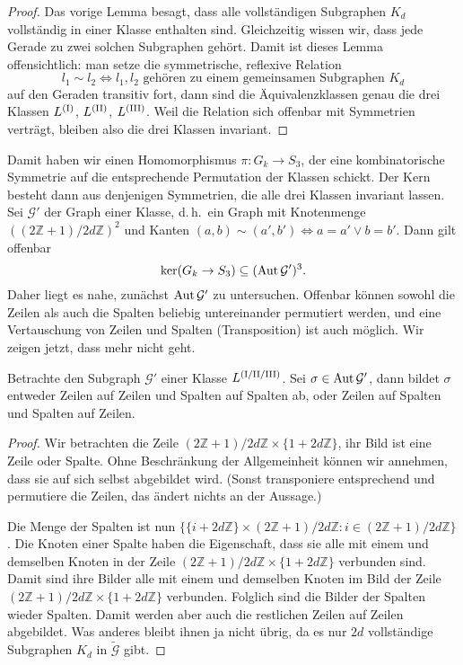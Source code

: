 \begin{proof}
Das vorige Lemma besagt, dass alle vollständigen Subgraphen $K_d$ vollständig in einer Klasse enthalten sind. Gleichzeitig wissen wir, dass jede Gerade zu zwei solchen Subgraphen gehört. Damit ist dieses Lemma offensichtlich: man setze die symmetrische, reflexive Relation
\begin{equation*}
l_1 \sim l_2 \Longleftrightarrow l_1, l_2 \text{ gehören zu einem gemeinsamen Subgraphen } K_d
\end{equation*}
auf den Geraden transitiv fort, dann sind die Äquivalenzklassen genau die drei Klassen $\Lcl(I)$, $\Lcl(II)$, $\Lcl(III)$. Weil die Relation sich offenbar mit Symmetrien verträgt, bleiben also die drei Klassen invariant.
\end{proof}

Damit haben wir einen Homomorphismus $\pi: G_k \to S_3$, der eine kombinatorische Symmetrie auf die entsprechende Permutation der Klassen schickt. Der Kern besteht dann aus denjenigen Symmetrien, die alle drei Klassen invariant lassen. Sei $\mathcal G'$ der Graph einer Klasse, d.\,h.~ein Graph mit Knotenmenge $((2\mathbb Z+1)/2d\mathbb Z)^2$ und Kanten $(a,b) \sim (a',b') \Longleftrightarrow a=a' \vee b=b'$. Dann gilt offenbar
\begin{equation}
\ker(G_k \rightarrow S_3) \subseteq (\operatorname{Aut} \mathcal G')^3.
\end{equation}
Daher liegt es nahe, zunächst $\operatorname{Aut} \mathcal G'$ zu untersuchen. Offenbar können sowohl die Zeilen als auch die Spalten beliebig untereinander permutiert werden, und eine Vertauschung von Zeilen und Spalten (Transposition) ist auch möglich. Wir zeigen jetzt, dass mehr nicht geht.
\begin{lemma}
Betrachte den Subgraph $\mathcal G'$ einer Klasse $\Lcl(I/II/III)$. Sei $\sigma \in \operatorname{Aut} \mathcal G'$, dann bildet $\sigma$ entweder Zeilen auf Zeilen und Spalten auf Spalten ab, oder Zeilen auf Spalten und Spalten auf Zeilen.
\end{lemma}
\begin{proof}
Wir betrachten die Zeile $(2\mathbb Z+1)/2d\mathbb Z \times \{1 + 2d\mathbb Z\}$, ihr Bild ist eine Zeile oder Spalte. Ohne Beschränkung der Allgemeinheit können wir annehmen, dass sie auf sich selbst abgebildet wird. (Sonst transponiere entsprechend und permutiere die Zeilen, das ändert nichts an der Aussage.)

Die Menge der Spalten ist nun $\{\{i + 2d\mathbb Z\} \times (2\mathbb Z+1)/2d\mathbb Z : i \in (2\mathbb Z+1)/2d\mathbb Z\}$. Die Knoten einer Spalte haben die Eigenschaft, dass sie alle mit einem und demselben Knoten in der Zeile $(2\mathbb Z+1)/2d\mathbb Z \times \{1 + 2d\mathbb Z\}$ verbunden sind. Damit sind ihre Bilder alle mit einem und demselben Knoten im Bild der Zeile $(2\mathbb Z+1)/2d\mathbb Z \times \{1 + 2d\mathbb Z\}$ verbunden. Folglich sind die Bilder der Spalten wieder Spalten. Damit werden aber auch die restlichen Zeilen auf Zeilen abgebildet. Was anderes bleibt ihnen ja nicht übrig, da es nur $2d$ vollständige Subgraphen $K_d$ in $\tilde{\mathcal G}$ gibt.
\end{proof}

